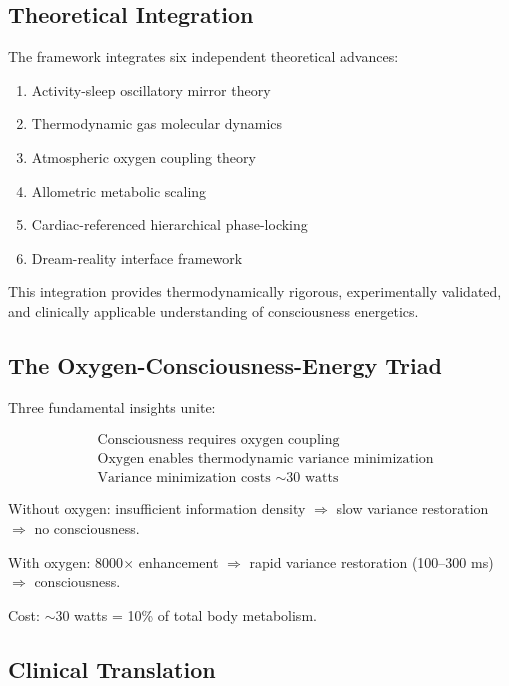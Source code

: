 \documentclass[12pt,twocolumn]{article}
\theoremstyle{remark}
\begin{document}
\subsection{Theoretical Integration}

The framework integrates six independent theoretical advances:
\begin{enumerate}
\item Activity-sleep oscillatory mirror theory
\item Thermodynamic gas molecular dynamics
\item Atmospheric oxygen coupling theory
\item Allometric metabolic scaling
\item Cardiac-referenced hierarchical phase-locking
\item Dream-reality interface framework
\end{enumerate}

This integration provides thermodynamically rigorous, experimentally validated, and clinically applicable understanding of consciousness energetics.

\subsection{The Oxygen-Consciousness-Energy Triad}

Three fundamental insights unite:

\begin{equation}
\boxed{
\begin{aligned}
&\text{Consciousness requires oxygen coupling} \\
&\text{Oxygen enables thermodynamic variance minimization} \\
&\text{Variance minimization costs } \sim\text{30 watts}
\end{aligned}
}
\end{equation}

Without oxygen: insufficient information density $\Rightarrow$ slow variance restoration $\Rightarrow$ no consciousness.

With oxygen: 8000$\times$ enhancement $\Rightarrow$ rapid variance restoration (100--300 ms) $\Rightarrow$ consciousness.

Cost: $\sim$30 watts = 10\% of total body metabolism.

\subsection{Clinical Translation}
\end{document}
